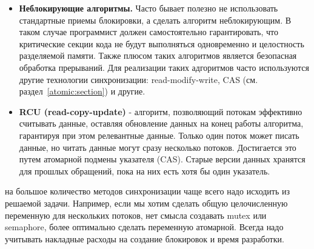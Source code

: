 {\begin{itemize}
			\item\textbf{Неблокирующие алгоритмы.} Часто бывает полезно не использовать стандартные приемы блокировки, а сделать алгоритм неблокирующим. В таком случае программист должен самостоятельно гарантировать, что критические секции кода не будут выполняться одновременно и целостность разделяемой памяти. Также плюсом таких алгоритмов является безопасная обработка прерываний. Для реализации таких адгоритмов часто используются другие технологии синхронизации: read-modify-write, CAS (см. раздел~\ref{atomic:section}) и другие.
			\item\textbf{RCU (read-copy-update)} - алгоритм, позволяющий потокам эффективно считывать данные, оставляя обновление данных на конец работы алгоритма, гарантируя при этом релевантные данные. Только один поток может писать данные, но читать данные могут сразу несколько потоков. Достигается это путем атомарной подмены указателя (CAS). Старые версии данных хранятся для прошлых обращений, пока на них есть хотя бы один указатель.
		\end{itemize}
	 на большое количество методов синхронизации чаще всего надо исходить из решаемой задачи. Например, если мы хотим сделать общую целочисленную переменную для нескольких потоков, нет смысла создавать mutex или semaphore, более оптимально сделать переменную атомарной. Всегда надо учитывать накладные расходы на создание блокировок и время разработки.
}